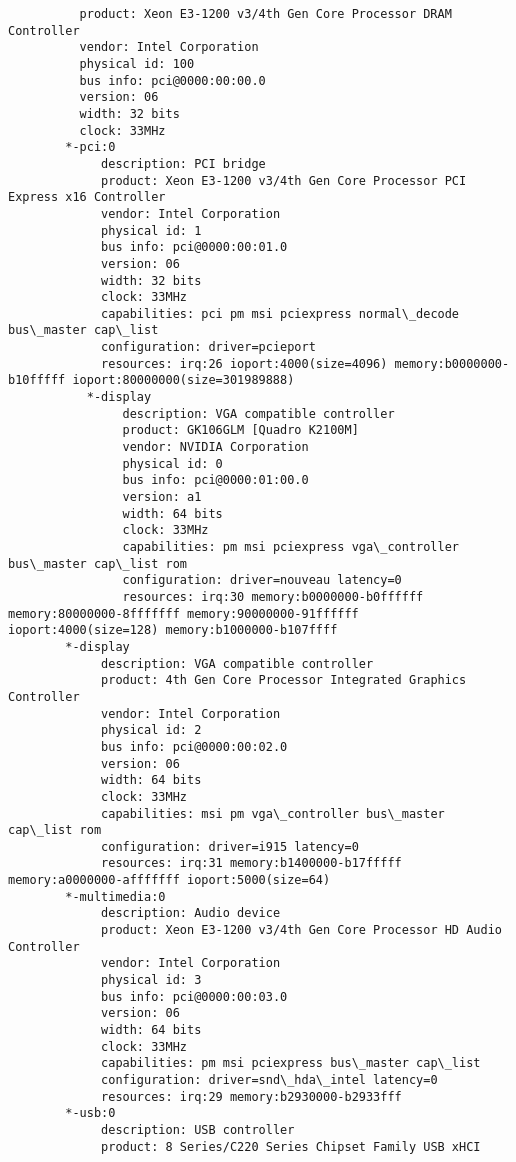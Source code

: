 \begin{verbatim}
          product: Xeon E3-1200 v3/4th Gen Core Processor DRAM Controller
          vendor: Intel Corporation
          physical id: 100
          bus info: pci@0000:00:00.0
          version: 06
          width: 32 bits
          clock: 33MHz
        *-pci:0
             description: PCI bridge
             product: Xeon E3-1200 v3/4th Gen Core Processor PCI Express x16 Controller
             vendor: Intel Corporation
             physical id: 1
             bus info: pci@0000:00:01.0
             version: 06
             width: 32 bits
             clock: 33MHz
             capabilities: pci pm msi pciexpress normal\_decode bus\_master cap\_list
             configuration: driver=pcieport
             resources: irq:26 ioport:4000(size=4096) memory:b0000000-b10fffff ioport:80000000(size=301989888)
           *-display
                description: VGA compatible controller
                product: GK106GLM [Quadro K2100M]
                vendor: NVIDIA Corporation
                physical id: 0
                bus info: pci@0000:01:00.0
                version: a1
                width: 64 bits
                clock: 33MHz
                capabilities: pm msi pciexpress vga\_controller bus\_master cap\_list rom
                configuration: driver=nouveau latency=0
                resources: irq:30 memory:b0000000-b0ffffff memory:80000000-8fffffff memory:90000000-91ffffff ioport:4000(size=128) memory:b1000000-b107ffff
        *-display
             description: VGA compatible controller
             product: 4th Gen Core Processor Integrated Graphics Controller
             vendor: Intel Corporation
             physical id: 2
             bus info: pci@0000:00:02.0
             version: 06
             width: 64 bits
             clock: 33MHz
             capabilities: msi pm vga\_controller bus\_master cap\_list rom
             configuration: driver=i915 latency=0
             resources: irq:31 memory:b1400000-b17fffff memory:a0000000-afffffff ioport:5000(size=64)
        *-multimedia:0
             description: Audio device
             product: Xeon E3-1200 v3/4th Gen Core Processor HD Audio Controller
             vendor: Intel Corporation
             physical id: 3
             bus info: pci@0000:00:03.0
             version: 06
             width: 64 bits
             clock: 33MHz
             capabilities: pm msi pciexpress bus\_master cap\_list
             configuration: driver=snd\_hda\_intel latency=0
             resources: irq:29 memory:b2930000-b2933fff
        *-usb:0
             description: USB controller
             product: 8 Series/C220 Series Chipset Family USB xHCI

\end{verbatim}

